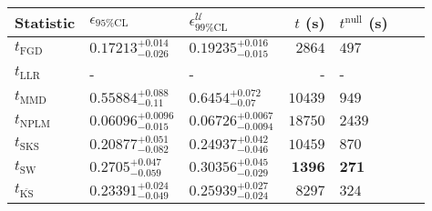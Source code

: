 \begin{tabular}{l|llr|llr}
	Statistic & $\epsilon_{95\%\mathrm{CL}}$ & $\epsilon^    {\mathcal{U}}_{99\%\mathrm{CL}}$ & $t$ (s) & $t^{\mathrm{null}}$ (s) \\
	\midrule
	$t_{\mathrm{FGD}}$ & ${\mathbf{0.17213_{-0.026}^{+0.014}}}$ & ${\mathbf{0.19235_{-0.015}^{+0.016}}}$ & $2864$ & $497$ \\
	$t_{\mathrm{LLR}}$ & - & - & - & - \\
	$t_{\mathrm{MMD}}$ & $0.55884_{-0.11}^{+0.088}$ & $0.6454_{-0.07}^{+0.072}$ & $10439$ & $949$ \\
\rowcolor{red!35}	$t_{\mathrm{NPLM}}$ & $0.06096_{-0.015}^{+0.0096}$ & $0.06726_{-0.0094}^{+0.0067}$ & $18750$ & $2439$ \\
	$t_{\mathrm{SKS}}$ & $0.20877_{-0.082}^{+0.051}$ & $0.24937_{-0.046}^{+0.042}$ & $10459$ & $870$ \\
	$t_{\mathrm{SW}}$ & $0.2705_{-0.059}^{+0.047}$ & $0.30356_{-0.029}^{+0.045}$ & ${\mathbf{1396}}$ & ${\mathbf{271}}$ \\
	$t_{\overline{\mathrm{KS}}}$ & $0.23391_{-0.049}^{+0.024}$ & $0.25939_{-0.024}^{+0.027}$ & $8297$ & $324$ \\
	\bottomrule
\end{tabular}